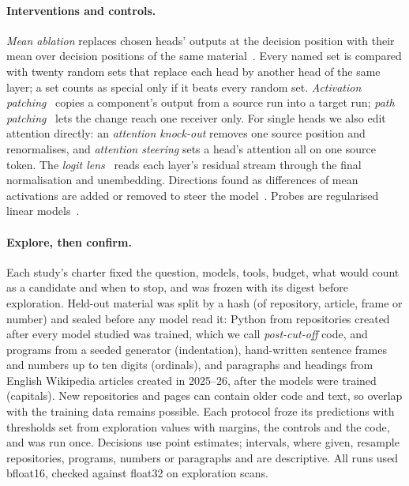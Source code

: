 \documentclass[11pt]{article}
\begin{document}
\paragraph{Interventions and controls.} \emph{Mean ablation} replaces chosen heads' outputs at the decision position with their mean over decision positions of the same material~\citep{heimersheim2024patching,zhang2024patching}. Every named set is compared with twenty random sets that replace each head by another head of the same layer; a set counts as special only if it beats every random set. \emph{Activation patching}~\citep{meng2022locating} copies a component's output from a source run into a target run; \emph{path patching}~\citep{wang2023ioi,goldowskydill2023path} lets the change reach one receiver only. For single heads we also edit attention directly: an \emph{attention knock-out} removes one source position and renormalises, and \emph{attention steering} sets a head's attention all on one source token. The \emph{logit lens}~\citep{nostalgebraist2020logitlens,belrose2023tuned} reads each layer's residual stream through the final normalisation and unembedding. Directions found as differences of mean activations are added or removed to steer the model~\citep{turner2023steering,panickssery2023caa}. Probes are regularised linear models~\citep{alain2016probes}.

\paragraph{Explore, then confirm.} Each study's charter fixed the question, models, tools, budget, what would count as a candidate and when to stop, and was frozen with its digest before exploration. Held-out material was split by a hash (of repository, article, frame or number) and sealed before any model read it: Python from repositories created after every model studied was trained, which we call \emph{post-cut-off} code, and programs from a seeded generator (indentation), hand-written sentence frames and numbers up to ten digits (ordinals), and paragraphs and headings from English Wikipedia articles created in 2025--26, after the models were trained (capitals). New repositories and pages can contain older code and text, so overlap with the training data remains possible. Each protocol froze its predictions with thresholds set from exploration values with margins, the controls and the code, and was run once. Decisions use point estimates; intervals, where given, resample repositories, programs, numbers or paragraphs and are descriptive. All runs used bfloat16, checked against float32 on exploration scans.
\end{document}
